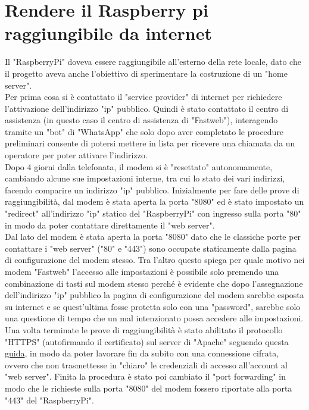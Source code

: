 \section{Rendere il Raspberry pi raggiungibile da internet}\label{sez:Rendere il Raspberry pi raggiungibile da internet}
Il "RaspberryPi" doveva essere raggiungibile all'esterno della rete locale, dato che  il progetto aveva anche l'obiettivo di sperimentare la costruzione di un "home server".\\
Per prima cosa si è contattato il "service provider" di internet per richiedere l'attivazione dell'indirizzo "ip" pubblico. Quindi è stato contattato il centro di assistenza (in questo caso il centro di assistenza di "Fastweb"), interagendo tramite un "bot" di "WhatsApp" che solo dopo aver completato le procedure preliminari consente di potersi mettere in lista per ricevere una chiamata da un operatore per poter attivare l'indirizzo.\\
Dopo 4 giorni dalla telefonata, il modem si è "resettato" autonomamente, cambiando alcune sue impostazioni interne, tra cui lo stato dei vari indirizzi, facendo comparire un indirizzo "ip" pubblico. 
Inizialmente per fare delle prove di raggiungibilità, dal modem è stata aperta la porta "8080" ed è stato impostato un "redirect" all'indirizzo "ip" statico del "RaspberryPi" con ingresso sulla porta "80" in modo da poter contattare direttamente il "web server".\\
Dal lato del modem è stata aperta la porta "8080" dato che le classiche porte  per contattare i "web server" ("80" e "443") sono occupate staticamente dalla pagina di configurazione del modem stesso. Tra l'altro questo spiega per quale motivo nei modem "Fastweb" l'accesso alle impostazioni è possibile solo premendo una combinazione di tasti sul modem stesso perché è evidente che dopo l'assegnazione dell'indirizzo "ip" pubblico la pagina di configurazione del modem sarebbe esposta su internet e se quest'ultima fosse protetta solo con una "password", sarebbe solo una questione di tempo che un mal intenzionato possa accedere alle impostazioni.\\
Una volta terminate le prove di raggiungibilità è stato abilitato il protocollo "HTTPS" (autofirmando il certificato) sul server di "Apache" seguendo questa \href{https://peppe8o.com/self-signed-certificate-https-in-raspberry-pi-with-apache/}{guida}, in modo da poter lavorare fin da subito con una connessione cifrata, ovvero che non trasmettesse in "chiaro" le credenziali di accesso all'account al "web server". Finita la procedura è stato poi cambiato il "port forwarding" in modo che le richieste sulla porta "8080" del modem fossero riportate alla porta "443" del "RaspberryPi".\\
